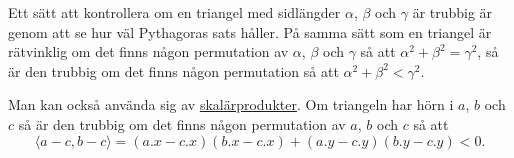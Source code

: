 Ett sätt att kontrollera om en triangel med sidlängder $\alpha$, $\beta$ och $\gamma$ är trubbig är genom att se hur väl Pythagoras sats håller.
På samma sätt som en triangel är rätvinklig om det finns någon permutation av $\alpha$, $\beta$ och $\gamma$ så att $\alpha^2+\beta^2 = \gamma^2$,
så är den trubbig om det finns någon permutation så att $\alpha^2+\beta^2 < \gamma^2$.

Man kan också använda sig av \href{https://en.wikipedia.org/wiki/Dot_product}{skalärprodukter}. Om triangeln har hörn i $a$, $b$ och $c$ så är den trubbig om det finns någon permutation av $a$, $b$ och $c$ så att
\[
  \langle a-c, b-c \rangle = (a.x-c.x) (b.x-c.x) + (a.y-c.y) (b.y-c.y) < 0.
\]
